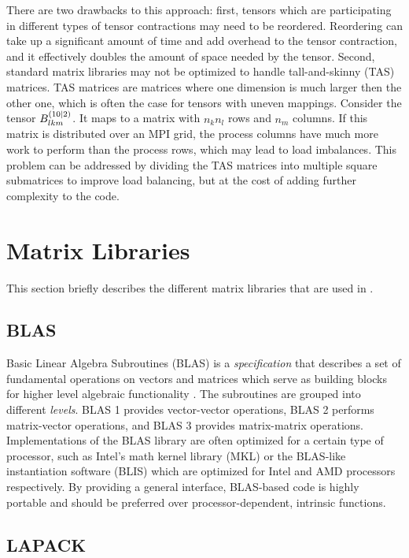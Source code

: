 There are two drawbacks to this approach: first, tensors which are participating in different types of tensor contractions may need to be reordered. Reordering can take up a significant amount of time and add overhead to the tensor contraction, and it effectively doubles the amount of space needed by the tensor. Second, standard matrix libraries may not be optimized to handle tall-and-skinny (TAS) matrices. TAS matrices are matrices where one dimension is much larger then the other one, which is often the case for tensors with uneven mappings. Consider the tensor  $B_{lkm}^{\left( 10 \mid 2 \right)}$. It maps to a matrix with $n_kn_l$ rows and $n_m$ columns. If this matrix is distributed over an MPI grid, the process columns have much more work to perform than the process rows, which may lead to load imbalances. This problem can be addressed by dividing the TAS matrices into multiple square submatrices to improve load balancing, but at the cost of adding further complexity to the code.

\section{Matrix Libraries}

This section briefly describes the different matrix libraries that are used in \mchem{}.

\subsection{BLAS}

Basic Linear Algebra Subroutines (BLAS) is a \emph{specification} that describes a set of fundamental operations on vectors and matrices which serve as building blocks for higher level algebraic functionality \cite{BLAS2021}. The subroutines are grouped into different \emph{levels}. BLAS 1 provides vector-vector operations, BLAS 2 performs matrix-vector operations, and BLAS 3 provides matrix-matrix operations. Implementations of the BLAS library are often optimized for a certain type of processor, such as Intel's math kernel library (MKL) or the BLAS-like instantiation software (BLIS) which are optimized for Intel and AMD processors respectively. By providing a general interface, BLAS-based code is highly portable and should be preferred over processor-dependent, intrinsic functions. 

\subsection{LAPACK}

